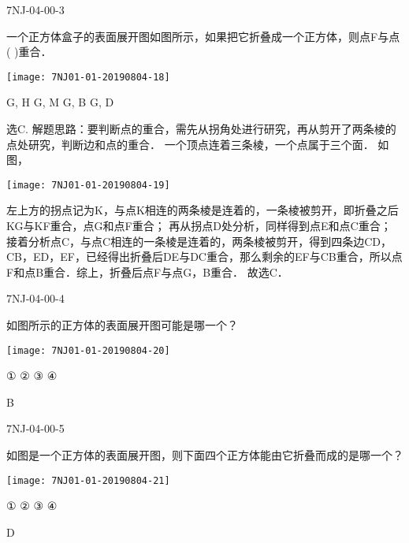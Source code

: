 \begin{defproblem}{7NJ-04-00-3}%
\begin{onlyproblem}%
一个正方体盒子的表面展开图如图所示，如果把它折叠成一个正方体，则点F与点(    )重合． 
\begin{center}
\texttt{[image: 7NJ01-01-20190804-18]}
\end{center}

\xx
{G, H}
{G, M}
{G, B}
{G, D}


\end{onlyproblem}%
\begin{onlysolution}%
\begin{solution}%
选C.
解题思路：要判断点的重合，需先从拐角处进行研究，再从剪开了两条棱的点处研究，判断边和点的重合． 一个顶点连着三条棱，一个点属于三个面． 如图， 
\begin{center}
\texttt{[image: 7NJ01-01-20190804-19]}
\end{center}

  左上方的拐点记为K，与点K相连的两条棱是连着的，一条棱被剪开，即折叠之后KG与KF重合，点G和点F重合； 再从拐点D处分析，同样得到点E和点C重合； 接着分析点C，与点C相连的一条棱是连着的，两条棱被剪开，得到四条边CD，CB，ED，EF，已经得出折叠后DE与DC重合，那么剩余的EF与CB重合，所以点F和点B重合．综上，折叠后点F与点G，B重合． 故选C． 
\end{solution}%
\end{onlysolution}%
\end{defproblem}


\begin{defproblem}{7NJ-04-00-4}%
\begin{onlyproblem}%
如图所示的正方体的表面展开图可能是哪一个？ 
\begin{center}
\texttt{[image: 7NJ01-01-20190804-20]}
\end{center}

\xx
{①}
{②}
{③}
{④}


\end{onlyproblem}%
\begin{onlysolution}%
\begin{solution}%
B
\end{solution}%
\end{onlysolution}%
\end{defproblem}


\begin{defproblem}{7NJ-04-00-5}%
\begin{onlyproblem}%
如图是一个正方体的表面展开图，则下面四个正方体能由它折叠而成的是哪一个？ 
\begin{center}
\texttt{[image: 7NJ01-01-20190804-21]}
\end{center}

\xx
{①}
{②}
{③}
{④}


\end{onlyproblem}%
\begin{onlysolution}%
\begin{solution}%
D
\end{solution}%
\end{onlysolution}%
\end{defproblem}



